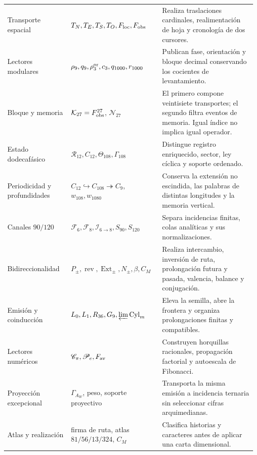 {\begin{longtable}{@{}>{\raggedright\arraybackslash}p{}>{\raggedright\arraybackslash}p{}>{\raggedright\arraybackslash}p{}@{}}
Transporte espacial&
\(T_N,T_E,T_S,T_O,F_{\rm loc},F_{\rm obs}\)&
Realiza traslaciones cardinales, realimentación de hoja y cronología de dos
cursores.\\

Lectores modulares&
\(\rho_9,q_9,\rho_3^{\rm or},c_3,q_{1000},r_{1000}\)&
Publican fase, orientación y bloque decimal conservando los cocientes de
levantamiento.\\

Bloque y memoria&
\(\mathcal K_{27}=F_{\rm obs}^{27}\), \(\mathcal N_{27}\)&
El primero compone veintisiete transportes; el segundo filtra eventos de
memoria. Igual índice no implica igual operador.\\

Estado dodecafásico&
\(\mathcal R_{12},C_{12},\Theta_{108},\Gamma_{108}\)&
Distingue registro enriquecido, sector, ley cíclica y soporte ordenado.\\

Periodicidad y profundidades&
\(C_{12}\hookrightarrow C_{108}\twoheadrightarrow C_9\),
\(w_{108},w_{1080}\)&
Conserva la extensión no escindida, las palabras de distintas longitudes y
la memoria vertical.\\

Canales \(90/120\)&
\(\mathcal F_6,\mathcal F_8,\mathcal I_{6\to8},
S_{90},S_{120}\)&
Separa incidencias finitas, colas analíticas y sus normalizaciones.\\

Bidireccionalidad&
\(P_\pm,\operatorname{rev},\operatorname{Ext}_\pm,
N_\pm,\beta,C_M\)&
Realiza intercambio, inversión de ruta, prolongación futura y pasada,
valencia, balance y conjugación.\\

Emisión y coinducción&
\(L_0,L_1,R_{36},G_9,\varprojlim\operatorname{Cyl}_m\)&
Eleva la semilla, abre la frontera y organiza prolongaciones finitas y
compatibles.\\

Lectores numéricos&
\(\mathscr C_\pi,\mathscr P_e,F_{\rm av}\)&
Construyen horquillas racionales, propagación factorial y autoescala de
Fibonacci.\\

Proyección excepcional&
\(\Gamma_{A_W}\), peso, soporte proyectivo&
Transporta la misma emisión a incidencia ternaria sin seleccionar cifras
arquimedianas.\\

Atlas y realización&
firma de ruta, atlas \(81/56/13/324\), \(C_M\)&
Clasifica historias y caracteres antes de aplicar una carta dimensional.\\


\end{longtable}}
